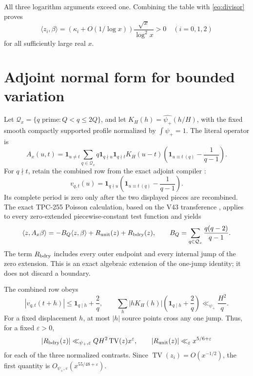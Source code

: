 \documentclass[10pt]{article}
\newcommand{\one}{\mathbf 1}
\newcommand{\ip}[2]{\langle #1,#2\rangle}
\newcommand{\Ax}{A_x}
\newcommand{\Qx}{\mathcal Q_x}
\newcommand{\TV}{\operatorname{TV}}
\newcommand{\e}{\varepsilon}
\begin{document}
All three logarithm arguments exceed one.  Combining the table with
\eqref{eq:divisor} proves
\begin{equation}
 \ip{z_i}{\beta}=(\kappa_i+O(1/\log x))\frac{\sqrt{x}}{\log^2x}>0
 \quad (i=0,1,2)                                  \label{eq:betacontrasts}
\end{equation}
for all sufficiently large real \(x\).

\section{Adjoint normal form for bounded variation}

Let \(\Qx=\{q\text{ prime}:Q<q\leq2Q\}\), and let
\(K_H(h)=\widehat{\psi_+}(h/H)\), with the fixed smooth compactly supported
profile normalized by \(\int\psi_+=1\).  The literal operator is
\begin{equation}
 \Ax(u,t)=\one_{u\ne t}\sum_{q\in\Qx}q\one_{q\nmid u}\one_{q\nmid t}
 K_H(u-t)\left(\one_{u\equiv t\ (q)}-\frac1{q-1}\right). \label{eq:operator}
\end{equation}
For \(q\nmid t\), retain the combined row from the exact adjoint compiler
\cite{tpc255}:
\[
 v_{q,t}(u)=\one_{q\nmid u}\left(\one_{u\equiv t\ (q)}-\frac1{q-1}\right).
\]
Its complete period is zero only after the two displayed pieces are
 recombined.  The exact TPC-255 Poisson calculation, based on the V43
transference \cite{v43}, applies to every
zero-extended piecewise-constant test function and yields
\begin{equation}
 \ip{z}{\Ax\beta}=-B_Q\ip{z}{\beta}+R_{\rm unit}(z)+R_{\rm bdry}(z),
 \qquad B_Q=\sum_{q\in\Qx}\frac{q(q-2)}{q-1}.             \label{eq:normalform}
\end{equation}
The term \(R_{\rm bdry}\) includes every outer endpoint and every internal
jump of the zero extension.  This is an exact algebraic extension of the
one-jump identity; it does not discard a boundary.

The combined row obeys
\begin{equation}
 |v_{q,t}(t+h)|\leq\one_{q\mid h}+\frac2q,\qquad
 \sum_h|hK_H(h)|\left(\one_{q\mid h}+\frac2q\right)
 \ll_{\psi_+}\frac{H^2}{q}.                           \label{eq:firstmoment}
\end{equation}
For a fixed displacement \(h\), at most \(|h|\) source points cross any
one jump.  Thus, for a fixed \(\e>0\),
\begin{equation}
 |R_{\rm bdry}(z)|\ll_{\psi_+,\e}QH^2\TV(z)x^\e,
 \qquad |R_{\rm unit}(z)|\ll_\e x^{5/6+\e}             \label{eq:remainders}
\end{equation}
for each of the three normalized contrasts.  Since \(\TV(z_i)=O(x^{-1/2})\),
the first quantity is \(O_{\psi_+,\e}(x^{55/48+\e})\).
\end{document}
